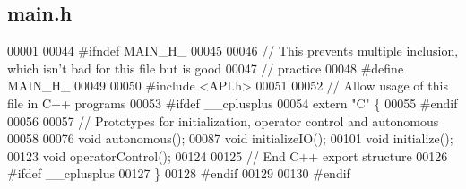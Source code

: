 \subsection{main.\+h}
\label{main_8h_source}

\begin{DoxyCode}
00001 
00044 \textcolor{preprocessor}{#ifndef MAIN\_H\_}
00045 
00046 \textcolor{comment}{// This prevents multiple inclusion, which isn't bad for this file but is good}
00047 \textcolor{comment}{// practice}
00048 \textcolor{preprocessor}{#define MAIN\_H\_}
00049 
00050 \textcolor{preprocessor}{#include <API.h>}
00051 
00052 \textcolor{comment}{// Allow usage of this file in C++ programs}
00053 \textcolor{preprocessor}{#ifdef \_\_cplusplus}
00054 \textcolor{keyword}{extern} \textcolor{stringliteral}{"C"} \{
00055 \textcolor{preprocessor}{#endif}
00056 
00057 \textcolor{comment}{// Prototypes for initialization, operator control and autonomous}
00058 
00076 \textcolor{keywordtype}{void} autonomous();
00087 \textcolor{keywordtype}{void} initializeIO();
00101 \textcolor{keywordtype}{void} initialize();
00123 \textcolor{keywordtype}{void} operatorControl();
00124 
00125 \textcolor{comment}{// End C++ export structure}
00126 \textcolor{preprocessor}{#ifdef \_\_cplusplus}
00127 \}
00128 \textcolor{preprocessor}{#endif}
00129 
00130 \textcolor{preprocessor}{#endif}
\end{DoxyCode}
